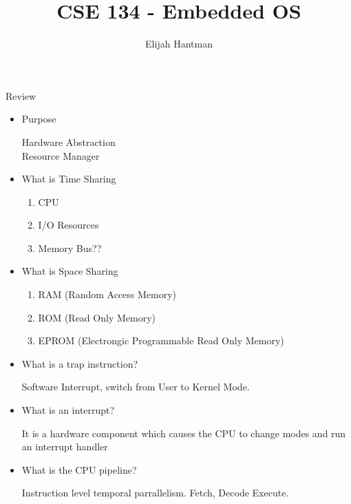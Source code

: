\documentclass{report}
\title{\Huge{CSE 134 - Embedded OS}}
\author{\huge{Elijah Hantman}}
\date{}
\begin{document}
\maketitle
\newpage

\begin{description}
    \item Review 
        \begin{itemize}
            \item Purpose
                \begin{mdframed}
                    Hardware Abstraction\\
                    Resource Manager
                \end{mdframed}
            \item What is Time Sharing
                \begin{enumerate}
                    \item CPU
                    \item I/O Resources
                    \item Memory Bus??
                \end{enumerate}
            \item What is Space Sharing
                \begin{enumerate}
                    \item RAM (Random Access Memory)
                    \item ROM (Read Only Memory)
                    \item EPROM (Electrongic Programmable Read Only Memory)
                \end{enumerate}
            \item What is a trap instruction?
                \begin{mdframed}
                    Software Interrupt, switch from User to Kernel
                    Mode.
                \end{mdframed}
            \item What is an interrupt?
                \begin{mdframed}
                    It is a hardware component which causes
                    the CPU to change modes and run an interrupt handler
                \end{mdframed}
            \item What is the CPU pipeline?
                \begin{mdframed}
                    Instruction level temporal parrallelism.
                    Fetch, Decode Execute.


\end{mdframed}
\end{itemize}
\end{description}
\end{document}
